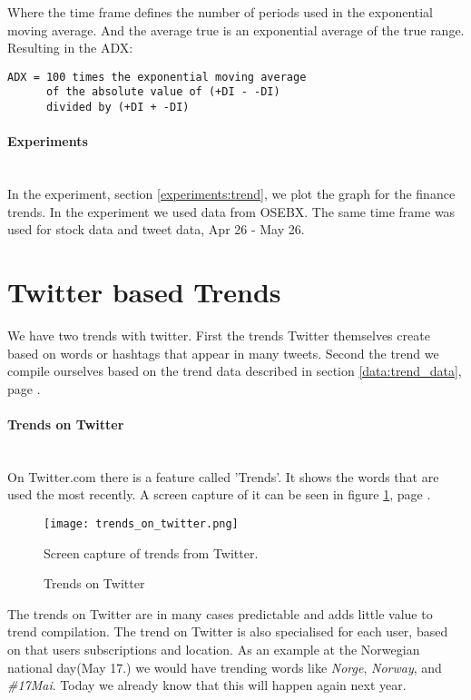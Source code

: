 Where the time frame defines the number of periods used in the exponential
moving average. And the average true is an exponential average of the true
range. Resulting in the ADX:
\begin{verbatim}
ADX = 100 times the exponential moving average 
      of the absolute value of (+DI - -DI) 
      divided by (+DI + -DI)
\end{verbatim}
%

\paragraph{Experiments}
\hspace{0pt}\\
In the experiment, section \ref{experiments:trend}, we plot the graph for
the finance trends. In the experiment we used data from OSEBX. The same time
frame was used for stock data and tweet data, Apr 26 - May 26.
%

\section{Twitter based Trends}\label{trend:trends_on_twitter}
We have two trends with twitter. First the trends Twitter themselves
create based on words or hashtags that appear in many tweets. Second the trend we
compile ourselves based on the trend data described in section
\ref{data:trend_data}, page \pageref{data:trend_data}. 

\paragraph{Trends on Twitter}
\hspace{0pt}\\
On Twitter.com there is a feature called 'Trends'. It shows the words that are
used the most recently. A screen capture of it can be seen in figure
\ref{fig:trends_on_twitter}, page \pageref{fig:trends_on_twitter}.

\begin{figure}[htb]
	\centering
    \texttt{[image: trends\_on\_twitter.png]}
    \label{fig:trends_on_twitter}
    \caption{Trends on Twitter}
Screen capture of trends from Twitter.
\end{figure}

The trends on Twitter are in many cases predictable and adds little value to trend
compilation. The trend on Twitter is also specialised for each user, based on
that users subscriptions and location. As an example at the Norwegian national
day(May 17.) we would have trending words like \textit{Norge}, \textit{Norway},
and \textit{\#17Mai}. Today we already know that this will happen again next
year.
%

